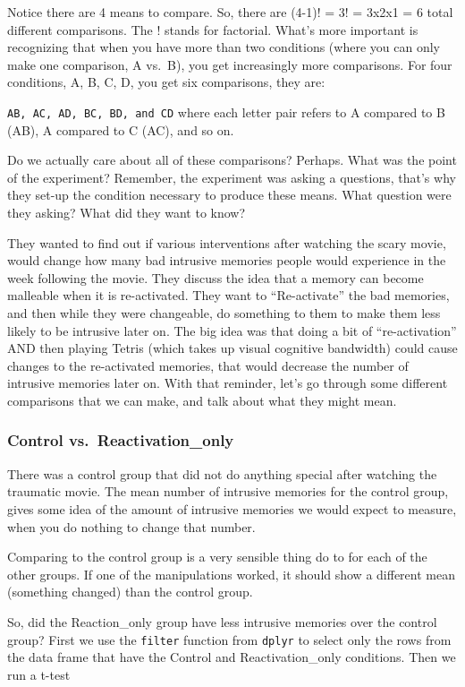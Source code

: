\documentclass[]{book}
\theoremstyle{definition}
\theoremstyle{definition}
\theoremstyle{definition}
\theoremstyle{remark}
\begin{document}
Notice there are 4 means to compare. So, there are (4-1)! = 3! = 3x2x1 =
6 total different comparisons. The ! stands for factorial. What's more
important is recognizing that when you have more than two conditions
(where you can only make one comparison, A vs.~B), you get increasingly
more comparisons. For four conditions, A, B, C, D, you get six
comparisons, they are:

\texttt{AB,\ AC,\ AD,\ BC,\ BD,\ and\ CD} where each letter pair refers
to A compared to B (AB), A compared to C (AC), and so on.

Do we actually care about all of these comparisons? Perhaps. What was
the point of the experiment? Remember, the experiment was asking a
questions, that's why they set-up the condition necessary to produce
these means. What question were they asking? What did they want to know?

They wanted to find out if various interventions after watching the
scary movie, would change how many bad intrusive memories people would
experience in the week following the movie. They discuss the idea that a
memory can become malleable when it is re-activated. They want to
``Re-activate'' the bad memories, and then while they were changeable,
do something to them to make them less likely to be intrusive later on.
The big idea was that doing a bit of ``re-activation'' AND then playing
Tetris (which takes up visual cognitive bandwidth) could cause changes
to the re-activated memories, that would decrease the number of
intrusive memories later on. With that reminder, let's go through some
different comparisons that we can make, and talk about what they might
mean.

\subsubsection{Control
vs.~Reactivation\_only}\label{control-vs.reactivation_only}

There was a control group that did not do anything special after
watching the traumatic movie. The mean number of intrusive memories for
the control group, gives some idea of the amount of intrusive memories
we would expect to measure, when you do nothing to change that number.

Comparing to the control group is a very sensible thing do to for each
of the other groups. If one of the manipulations worked, it should show
a different mean (something changed) than the control group.

So, did the Reaction\_only group have less intrusive memories over the
control group? First we use the \texttt{filter} function from
\texttt{dplyr} to select only the rows from the data frame that have the
Control and Reactivation\_only conditions. Then we run a t-test
\end{document}
